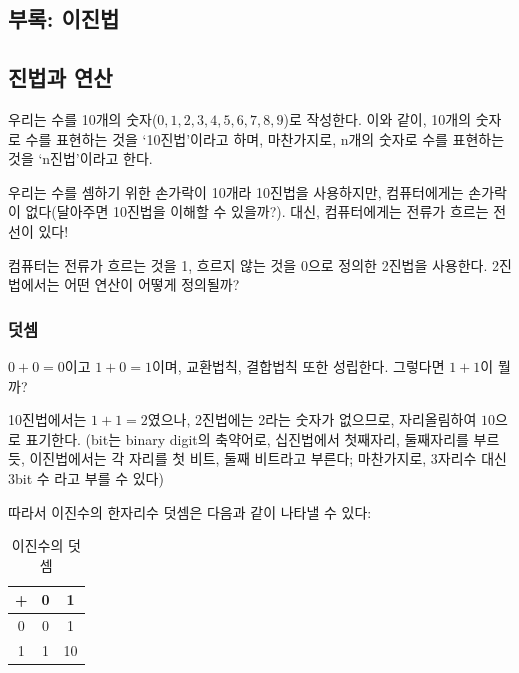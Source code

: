 \documentclass[a4paper,12pt]{book}
\begin{document}
\begin{appendices}

\chapter{부록: 이진법}

\section{진법과 연산}
\label{sec:digit-oper}

우리는 수를 10개의 숫자($0, 1, 2, 3, 4, 5, 6, 7, 8, 9$)로 작성한다.
이와 같이, 10개의 숫자로 수를 표현하는 것을 `10진법'이라고 하며,
마찬가지로, n개의 숫자로 수를 표현하는 것을 `n진법'이라고 한다.

우리는 수를 셈하기 위한 손가락이 10개라 10진법을 사용하지만,
컴퓨터에게는 손가락이 없다(달아주면 10진법을 이해할 수 있을까?).
대신, 컴퓨터에게는 전류가 흐르는 전선이 있다!

컴퓨터는 전류가 흐르는 것을 1, 흐르지 않는 것을 0으로 정의한 2진법을 사용한다.
2진법에서는 어떤 연산이 어떻게 정의될까?

\subsection{덧셈}

$0 + 0 = 0$이고 $1 + 0 = 1$이며, 교환법칙, 결합법칙 또한 성립한다.
그렇다면 $1 + 1$이 뭘까?

10진법에서는 $1 + 1 = 2$였으나, 2진법에는 2라는 숫자가 없으므로,
자리올림하여 $10$으로 표기한다.
(bit는 binary digit의 축약어로,
십진법에서 첫째자리, 둘째자리를 부르듯,
이진법에서는 각 자리를 첫 비트, 둘째 비트라고 부른다;
마찬가지로, 3자리수 대신 3bit 수 라고 부를 수 있다)

따라서 이진수의 한자리수 덧셈은 다음과 같이 나타낼 수 있다:

\begin{table}[H]
    \centering

    \caption{이진수의 덧셈}
    \label{Tab:addition-binary}

    \begin{tabular}{ || c || c | c || }
        \hline
        + & 0  & 1  \\
        \hline\hline
        0 & 0  & 1  \\
        \hline
        1 & 1  & 10 \\
        \hline
    \end{tabular}
\end{table}


\end{appendices}
\end{document}
